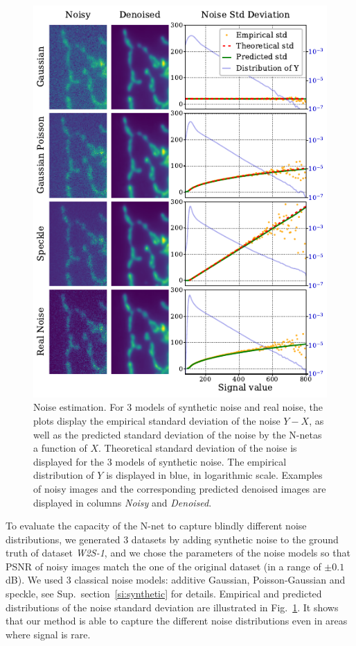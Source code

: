 \documentclass{article}
\begin{document}
\begin{figure}[ht]
\begin{center}
\centerline{\includegraphics[width=\columnwidth]{fig_noise_std.pdf}}
\caption[Noise estimation]{Noise estimation.
For 3 models of synthetic noise and real noise, the plots display the empirical standard deviation of the noise $Y - X$, as well as the predicted standard deviation of the noise by the N-net\protect\footnotemark as a function of $X$.
Theoretical standard deviation of the noise is displayed for the 3 models of synthetic noise.
The empirical distribution of $Y$ is displayed in blue, in logarithmic scale.
Examples of noisy images and the corresponding predicted denoised images are displayed in columns \textit{Noisy} and \textit{Denoised}.}
\label{fig:noisestd}
\end{center}
\vskip -0.2in
\end{figure}
To evaluate the capacity of the N-net to capture blindly different noise distributions, we generated 3 datasets by adding synthetic noise to the ground truth of dataset \textit{W2S-1}, and we chose the parameters of the noise models so that PSNR of noisy images match the one of the original dataset (in a range of $\pm0.1$dB).
We used 3 classical noise models: additive Gaussian, Poisson-Gaussian and speckle, see Sup.~section~\ref{si:synthetic} for details.
Empirical and predicted distributions of the noise standard deviation are illustrated in Fig.~\ref{fig:noisestd}.
It shows that our method is able to capture the different noise distributions even in areas where signal is rare.
\end{document}
